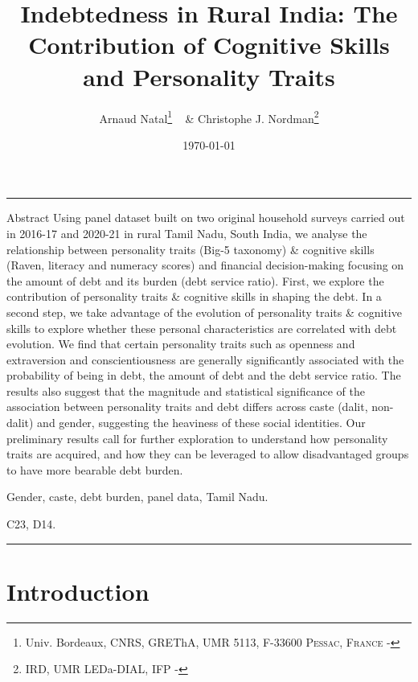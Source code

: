 \documentclass[a4paper, 12pt, onecolumn]{article}
\title{Indebtedness in Rural India: The Contribution of Cognitive Skills and Personality Traits}
\author{Arnaud Natal\thanks{Univ. Bordeaux, CNRS, GREThA, UMR 5113, F-33600 \textsc{Pessac, France} - \email{arnaud.natal@u-bordeaux.fr}} ~ \& Christophe J. Nordman\thanks{IRD, UMR LEDa-DIAL, IFP - \email{nordman@dial.prd}} }
\date{\today}
\begin{document}
\maketitle

\hrule 
\vspace{0.3cm}

\begin{resab}{Abstract}
Using panel dataset built on two original household surveys carried out in 2016-17 and 2020-21 in rural Tamil Nadu, South India, we analyse the relationship between personality traits (Big-5 taxonomy) \& cognitive skills (Raven, literacy and numeracy scores) and financial decision-making focusing on the amount of debt and its burden (debt service ratio).
First, we explore the contribution of personality traits \& cognitive skills in shaping the debt.
In a second step, we take advantage of the evolution of personality traits \& cognitive skills to explore whether these personal characteristics are correlated with debt evolution. 
We find that certain personality traits such as openness and extraversion and conscientiousness are generally significantly associated with the probability of being in debt, the amount of debt and the debt service ratio. 
The results also suggest that the magnitude and statistical significance of the association between personality traits and debt differs across caste (dalit, non-dalit) and gender, suggesting the heaviness of these social identities.
Our preliminary results call for further exploration to understand how personality traits are acquired, and how they can be leveraged to allow disadvantaged groups to have more bearable debt burden.
\end{resab}

\begin{keywords}
Gender, caste, debt burden, panel data, Tamil Nadu.
\end{keywords}

\begin{jelcodes}
C23, D14.
\end{jelcodes}

\hrule

\clearpage
\newpage
\section{Introduction}
\label{Introduction}
\end{document}
